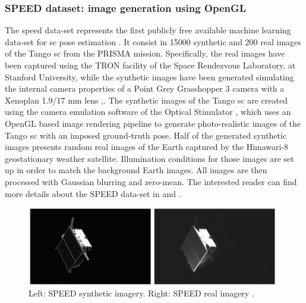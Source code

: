 \subsubsection{SPEED dataset: image generation using OpenGL}
The speed data-set represents the first publicly free available machine learning data-set for \acrshort{sc} pose estimation \cite{DBLP:journals/corr/abs-1911-02050}. It consist in 15000 synthetic and 200 real images of the Tango \acrshort{sc} from the PRISMA mission. Specifically, the real images have been captured using the TRON facility of the Space Rendezvous Laboratory, at Stanford University, while the synthetic images have been generated simulating the internal camera properties of a Point Grey Grasshopper 3 camera with a Xenoplan 1.9/17 mm lens \cite{Sharma2019},\cite{2019phdSharma}. The synthetic images of the Tango \acrshort{sc} are created using the camera emulation software of the Optical Stimulator \cite{Beierle2019}, which uses an OpenGL based image rendering pipeline to generate photo-realistic images of the Tango \acrshort{sc} with an imposed ground-truth pose. Half of the generated synthetic images presents random real images of the Earth captured by the Himawari-8 geostationary weather satellite. Illumination conditions for those images are set up in order to match the background Earth images. All images are then processed with Gaussian blurring and zero-mean. The interested reader can find more details about the SPEED data-set in \cite{DBLP:journals/corr/abs-1911-02050} and \cite{Beierle2019}.

\begin{figure}[htbp]
  \centering
  \includegraphics[width=0.98\textwidth]{gfx/speed2.eps}
  \caption{Left: SPEED synthetic imagery. Right: SPEED real imagery \cite{DBLP:journals/corr/abs-1911-02050}.}
  \label{fig:SPEED}
\end{figure}

